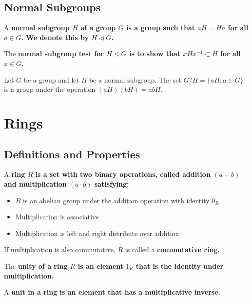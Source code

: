 \documentclass{hmwk}
\begin{document}
\subsection{Normal Subgroups}

\begin{defn}
A \bf{normal subgroup} $H$ of a group $G$ is a group such that $aH = Ha$ for all $a \in G$. We denote this by $H \lhd G$.
\end{defn}

\begin{prop}
The \bf{normal subgroup test} for $H \leq G$ is to show that $xHx^{-1} \subset H$ for all $x \in G$.
\end{prop}

\begin{prop}
Let $G$ be a group and let $H$ be a normal subgroup. The set $G/H = \{aH : a \in G\}$ is a group under the operation $(aH)(bH) = abH$.
\end{prop}

\newpage

\section{Rings}

\subsection{Definitions and Properties}

\begin{defn}
A \bf{ring} $R$ is a set with two binary operations, called addition $(a + b)$ and multiplication $(a \cdot b)$ satisfying:
\begin{itemize}
    \item $R$ is an abelian group under the addition operation with identity $0_R$
    \item Multiplication is associative
    \item Multiplication is left and right distribute over addition
\end{itemize}

If multiplication is also commutative, $R$ is called a \bf{commutative ring}.
\end{defn}

\begin{defn}
The \bf{unity} of a ring $R$ is an element $1_R$ that is the identity under multiplication.
\end{defn}

\begin{defn}
A \bf{unit} in a ring is an element that has a multiplicative inverse. 
\end{defn}
\end{document}
